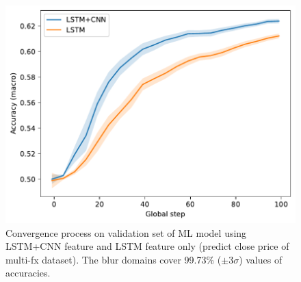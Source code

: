 \documentclass[aps,prb,groupedaddress,twocolumn,showpacs,dvipdfmx,superscriptaddress,pdftex]{revtex4-2}
\begin{document}
\begin{figure}
    \centering
    \includegraphics[width=\linewidth]{img/acc.pdf}
    \caption{Convergence process on validation set of ML model using LSTM+CNN feature and LSTM feature only (predict close price of multi-fx dataset). The blur domains cover 99.73\% ($±3\sigma$) values of accuracies.}
    \label{fig:lstm_cnn_feature}
\end{figure}

\end{document}
